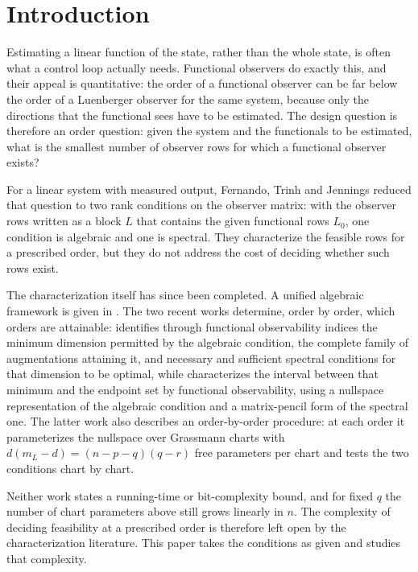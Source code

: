 \section{Introduction}\label{sec:intro}

Estimating a linear function of the state, rather than the whole state, is often what a
control loop actually needs. Functional observers do exactly this, and their appeal is
quantitative: the order of a functional observer can be far below the order of a
Luenberger observer for the same system, because only the directions that the functional
sees have to be estimated. The design question is therefore an order question: given the
system and the functionals to be estimated, what is the smallest number of observer rows
for which a functional observer exists?

For a linear system with measured output, Fernando, Trinh and Jennings \cite{fer10}
reduced that question to two rank conditions on the observer matrix: with the observer
rows written as a block $L$ that contains the given functional rows $L_0$, one condition
is algebraic and one is spectral. They characterize the feasible rows for a prescribed
order, but they do not address the cost of deciding whether such rows exist.

The characterization itself has since been completed. A unified algebraic framework is
given in \cite{dar25}. The two recent works \cite{fer26a,fer26b} determine, order by
order, which orders are attainable: \cite{fer26a} identifies through functional
observability indices the minimum dimension permitted by the algebraic condition, the
complete family of augmentations attaining it, and necessary and sufficient spectral
conditions for that dimension to be optimal, while \cite{fer26b} characterizes the
interval between that minimum and the endpoint set by functional observability, using a
nullspace representation of the algebraic condition and a matrix-pencil form of the
spectral one. The latter work also describes an order-by-order procedure: at each order
it parameterizes the nullspace over Grassmann charts with $d(m_L-d)=(n-p-q)(q-r)$ free
parameters per chart and tests the two conditions chart by chart.

Neither work states a running-time or bit-complexity bound, and for fixed $q$ the number
of chart parameters above still grows linearly in $n$. The complexity of deciding
feasibility at a prescribed order is therefore left open by the characterization
literature. This paper takes the conditions as given and studies that complexity.

